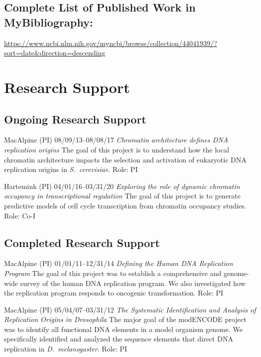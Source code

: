 \documentclass{nihbiosketch}
\newcommand\dmel{{\itshape D.~melanogaster}\xspace}
\newcommand\scer{{\itshape S.~cerevisiae}\xspace}
\begin{document}
\subsection*{Complete List of Published Work in MyBibliography:} 
\medskip

\url{https://www.ncbi.nlm.nih.gov/myncbi/browse/collection/44041939/?sort=date&direction=descending}



\section{Research Support}

\subsection*{Ongoing Research Support}
\medskip

{MacAlpine (PI)}
{08/09/13--08/08/17}
{\it Chromatin architecture defines DNA replication origins}
{The goal of this project is to understand how the local chromatin architecture impacts the selection and activation of eukaryotic DNA replication origins in \scer.}
{Role: PI}

\bigskip

{Hartemink (PI)}
{04/01/16--03/31/20}
{\it Exploring the role of dynamic chromatin occupancy in transcriptional regulation}
{The goal of this project is to generate predictive models of cell cycle transcription from chromatin occupancy studies.}
{Role: Co-I}

\bigskip



\subsection*{Completed Research Support}
\medskip

{MacAlpine (PI)}
{01/01/11--12/31/14}
{\it Defining the Human DNA Replication Program}
{The goal of this project was to establish a comprehensive and genome-wide survey of the human DNA replication program.  We also investigated how the replication program responds to oncogenic transformation.}
{Role: PI}

\bigskip

{MacAlpine (PI)}
{05/04/07--03/31/12}
{\it The Systematic Identification and Analysis of Replication Origins in Drosophila}
{The major goal of the modENCODE project was to identify all functional DNA elements in a model organism genome.  We  specifically identified and analyzed the sequence elements that direct DNA replication in \dmel.}
{Role: PI}
\end{document}
